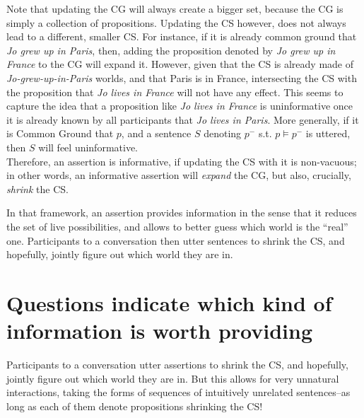 Note that updating the CG will always create a bigger set, because the CG is simply a collection of propositions. Updating the CS however, does not always lead to a different, smaller CS. For instance, if it is already common ground that \textit{Jo grew up in Paris}, then, adding the proposition denoted by \textit{Jo grew up in France} to the CG will expand it. However, given that the CS is already made of \textit{Jo-grew-up-in-Paris} worlds, and that Paris is in France, intersecting the CS with the proposition that \textit{Jo lives in France} will not have any effect. This seems to capture the idea that a proposition like \textit{Jo lives in France} is uninformative once it is already known by all participants that \textit{Jo lives in Paris}. More generally, if it is Common Ground that $p$, and a sentence $S$ denoting $p^-$ s.t. $p \vDash p^-$ is uttered, then $S$ will feel uninformative.\\

Therefore, an assertion is informative, if updating the CS with it is non-vacuous; in other words, an informative assertion will \textit{expand} the CG, but also, crucially, \textit{shrink} the CS.

\begin{exe}
	\label{ex:informativity}
\end{exe}


In that framework, an assertion provides information in the sense that it reduces the set of live possibilities, and allows to better guess which world is the ``real'' one. Participants to a conversation then utter sentences to shrink the CS, and hopefully, jointly figure out which world they are in.

\section{Questions indicate which kind of information is worth providing}

Participants to a conversation utter assertions to shrink the CS, and hopefully, jointly figure out which world they are in. But this allows for very unnatural interactions, taking the forms of sequences of intuitively unrelated sentences--as long as each of them denote propositions shrinking the CS!

\begin{exe}
	\label{ex:weird-assertion-sequence}
\end{exe}


